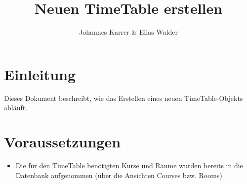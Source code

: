 \documentclass{article}
\title{Neuen TimeTable erstellen}
\author{Johannes Karrer \& Elias Walder}
\begin{document}
	\maketitle
	\section{Einleitung}
	Dieses Dokument beschreibt, wie das Erstellen eines neuen TimeTable-Objekts abläuft.
	
	\section{Voraussetzungen}
	\begin{itemize}
		\item Die für den TimeTable benötigten Kurse und Räume wurden bereits in die Datenbank aufgenommen (über die Ansichten Courses bzw. Rooms)
	\end{itemize}
	
\end{document}
